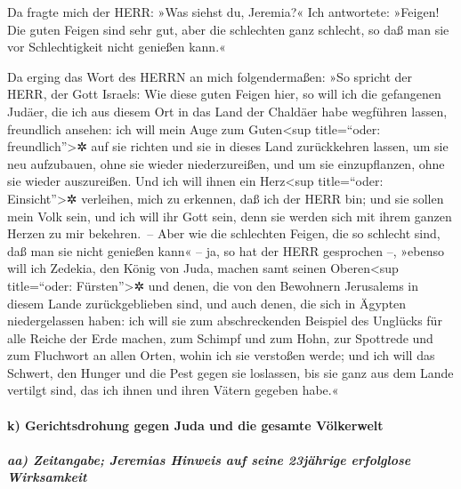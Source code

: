 Da fragte mich der HERR: »Was siehst du, Jeremia?« Ich
antwortete: »Feigen! Die guten Feigen sind sehr gut, aber die schlechten
ganz schlecht, so daß man sie vor Schlechtigkeit nicht genießen kann.«

Da erging das Wort des HERRN an mich folgendermaßen:
»So spricht der HERR, der Gott Israels: Wie diese guten
Feigen hier, so will ich die gefangenen Judäer, die ich aus diesem Ort
in das Land der Chaldäer habe wegführen lassen, freundlich ansehen:
ich will mein Auge zum Guten\textless sup title=``oder:
freundlich''\textgreater✲ auf sie richten und sie in dieses Land
zurückkehren lassen, um sie neu aufzubauen, ohne sie wieder
niederzureißen, und um sie einzupflanzen, ohne sie wieder auszureißen.
Und ich will ihnen ein Herz\textless sup title=``oder:
Einsicht''\textgreater✲ verleihen, mich zu erkennen, daß ich der HERR
bin; und sie sollen mein Volk sein, und ich will ihr Gott sein, denn sie
werden sich mit ihrem ganzen Herzen zu mir bekehren.~--
Aber wie die schlechten Feigen, die so schlecht sind, daß
man sie nicht genießen kann« -- ja, so hat der HERR gesprochen --,
»ebenso will ich Zedekia, den König von Juda, machen samt seinen
Oberen\textless sup title=``oder: Fürsten''\textgreater✲ und denen, die
von den Bewohnern Jerusalems in diesem Lande zurückgeblieben sind, und
auch denen, die sich in Ägypten niedergelassen haben: ich
will sie zum abschreckenden Beispiel des Unglücks für alle Reiche der
Erde machen, zum Schimpf und zum Hohn, zur Spottrede und zum Fluchwort
an allen Orten, wohin ich sie verstoßen werde; und ich
will das Schwert, den Hunger und die Pest gegen sie loslassen, bis sie
ganz aus dem Lande vertilgt sind, das ich ihnen und ihren Vätern gegeben
habe.«

\hypertarget{k-gerichtsdrohung-gegen-juda-und-die-gesamte-vuxf6lkerwelt}{%
\paragraph{k) Gerichtsdrohung gegen Juda und die gesamte
Völkerwelt}\label{k-gerichtsdrohung-gegen-juda-und-die-gesamte-vuxf6lkerwelt}}

\hypertarget{aa-zeitangabe-jeremias-hinweis-auf-seine-23juxe4hrige-erfolglose-wirksamkeit}{%
\subparagraph{aa) Zeitangabe; Jeremias Hinweis auf seine 23jährige
erfolglose
Wirksamkeit}\label{aa-zeitangabe-jeremias-hinweis-auf-seine-23juxe4hrige-erfolglose-wirksamkeit}}

